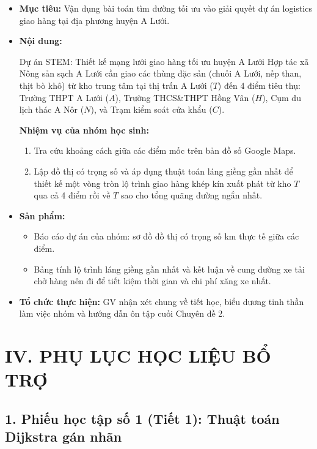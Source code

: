 \documentclass[12pt, a4paper]{article}
\begin{document}
\begin{itemize}[leftmargin=1.2cm]
\begin{itemize}[leftmargin=1.2cm]
    \item[a)] \textbf{Mục tiêu:} Vận dụng bài toán tìm đường tối ưu vào giải quyết dự án logistics giao hàng tại địa phương huyện A Lưới.
    \item[b)] \textbf{Nội dung:}
    \begin{stembox}{Dự án STEM: Thiết kế mạng lưới giao hàng tối ưu huyện A Lưới}
        Hợp tác xã Nông sản sạch A Lưới cần giao các thùng đặc sản (chuối A Lưới, nếp than, thịt bò khô) từ kho trung tâm tại thị trấn A Lưới ($T$) đến 4 điểm tiêu thụ: Trường THPT A Lưới ($A$), Trường THCS\&THPT Hồng Vân ($H$), Cụm du lịch thác A Nôr ($N$), và Trạm kiểm soát cửa khẩu ($C$).
        
        \textbf{Nhiệm vụ của nhóm học sinh:}
        \begin{enumerate}[leftmargin=0.6cm]
            \item Tra cứu khoảng cách giữa các điểm mốc trên bản đồ số Google Maps.
            \item Lập đồ thị có trọng số và áp dụng thuật toán láng giềng gần nhất để thiết kế một vòng tròn lộ trình giao hàng khép kín xuất phát từ kho $T$ qua cả 4 điểm rồi về $T$ sao cho tổng quãng đường ngắn nhất.
        \end{enumerate}
    \end{stembox}
    \item[c)] \textbf{Sản phẩm:}
    \begin{itemize}[leftmargin=0.6cm]
        \item Báo cáo dự án của nhóm: sơ đồ đồ thị có trọng số km thực tế giữa các điểm.
        \item Bảng tính lộ trình láng giềng gần nhất và kết luận về cung đường xe tải chở hàng nên đi để tiết kiệm thời gian và chi phí xăng xe nhất.
    \end{itemize}
    \item[d)] \textbf{Tổ chức thực hiện:} GV nhận xét chung về tiết học, biểu dương tinh thần làm việc nhóm và hướng dẫn ôn tập cuối Chuyên đề 2.
\end{itemize}

\section*{IV. PHỤ LỤC HỌC LIỆU BỔ TRỢ}

\subsection*{1. Phiếu học tập số 1 (Tiết 1): Thuật toán Dijkstra gán nhãn}


\end{itemize}
\end{document}
